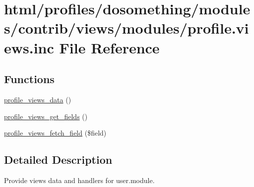 \hypertarget{profile_8views_8inc}{
\section{html/profiles/dosomething/modules/contrib/views/modules/profile.views.inc File Reference}
\label{profile_8views_8inc}
}
\subsection*{Functions}
\begin{DoxyCompactItemize}
\item 
\hyperlink{profile_8views_8inc_aa426eb57d5065555896e709b6f109c30}{profile\_\-views\_\-data} ()
\item 
\hyperlink{profile_8views_8inc_a8bf1ee086c336dadb69e8fe8728f17f0}{profile\_\-views\_\-get\_\-fields} ()
\item 
\hyperlink{profile_8views_8inc_ac5cda8db9f492d20dcbf2054cd1b0ad4}{profile\_\-views\_\-fetch\_\-field} (\$field)
\end{DoxyCompactItemize}


\subsection{Detailed Description}
Provide views data and handlers for user.module. 

